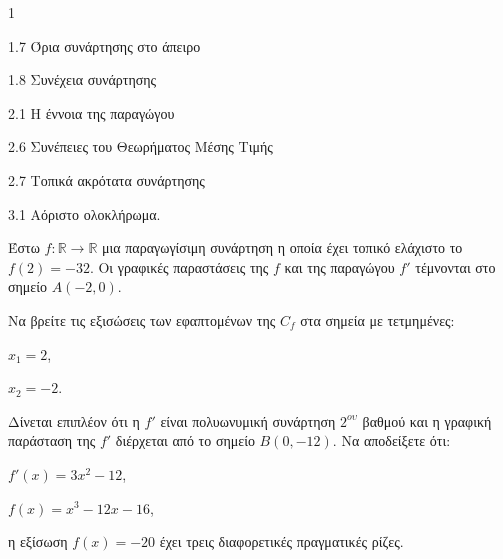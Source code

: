 \begin{ylh}{1}
    \item 1.7 Όρια συνάρτησης στο άπειρο
    \item 1.8 Συνέχεια συνάρτησης
    \item 2.1 Η έννοια της παραγώγου
    \item 2.6 Συνέπειες του Θεωρήματος Μέσης Τιμής
    \item 2.7 Τοπικά ακρότατα συνάρτησης
    \item 3.1 Αόριστο ολοκλήρωμα.
\end{ylh}
Έστω $f : \mathbb{R} \to \mathbb{R}$ μια παραγωγίσιμη συνάρτηση η οποία έχει τοπικό ελάχιστο το $f(2) = -32$.
Οι γραφικές παραστάσεις της $f$ και της παραγώγου $f'$ τέμνονται στο σημείο $A(-2, 0)$.
\begin{alist}
    \item Να βρείτε τις εξισώσεις των εφαπτομένων της $C_f$ στα σημεία με τετμημένες:
    \begin{rlist}
        \item $x_1 = 2$, 
        \item $x_2 = -2$. 
    \end{rlist}
    \item Δίνεται επιπλέον ότι η $f'$ είναι πολυωνυμική συνάρτηση $2^{ου}$ βαθμού και η γραφική παράσταση της $f'$ διέρχεται από το σημείο $B(0, -12)$. Να αποδείξετε ότι:
    \begin{rlist}
        \item $f'(x) = 3x^2 - 12$, 
        \item $f(x) = x^3 - 12x - 16$, 
        \item η εξίσωση $f(x) = -20$ έχει τρεις διαφορετικές πραγματικές ρίζες. 
    \end{rlist}
\end{alist}